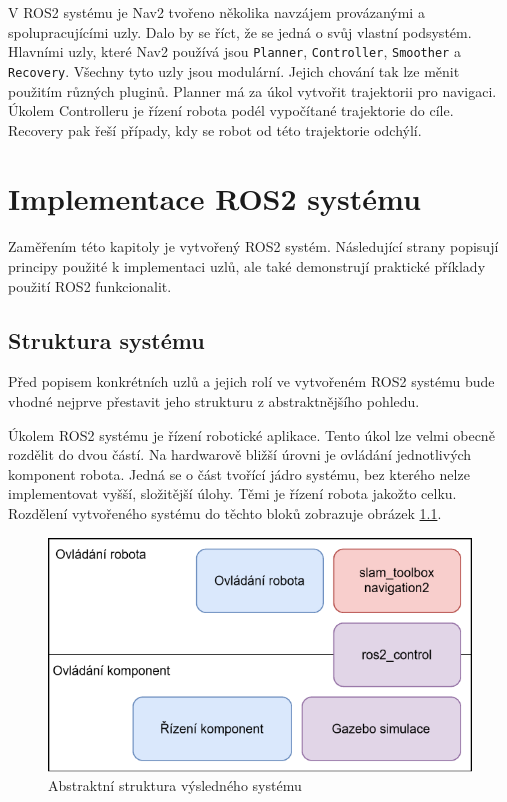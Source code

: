 V ROS2 systému je Nav2 tvořeno několika navzájem provázanými a spolupracujícími uzly. Dalo by se říct, že se jedná o svůj vlastní podsystém. Hlavními uzly, které Nav2 používá jsou \verb|Planner|, \verb|Controller|, \verb|Smoother| a \verb|Recovery|. Všechny tyto uzly jsou modulární. Jejich chování tak lze měnit použitím různých pluginů. Planner má za úkol vytvořit trajektorii pro navigaci. Úkolem Controlleru je řízení robota podél vypočítané trajektorie do cíle. Recovery pak řeší případy, kdy se robot od této trajektorie odchýlí. \cite{nav2_documentation}

\chapter{Implementace ROS2 systému}
Zaměřením této kapitoly je vytvořený ROS2 systém. Následující strany popisují principy použité k implementaci uzlů, ale také demonstrují praktické příklady použití ROS2 funkcionalit.

\section{Struktura systému}
Před popisem konkrétních uzlů a jejich rolí ve vytvořeném ROS2 systému bude vhodné nejprve přestavit jeho strukturu z abstraktnějšího pohledu.

Úkolem ROS2 systému je řízení robotické aplikace. Tento úkol lze velmi obecně rozdělit do dvou částí. Na hardwarově bližší úrovni je ovládání jednotlivých komponent robota. Jedná se o část tvořící jádro systému, bez kterého nelze implementovat vyšší, složitější úlohy. Těmi je řízení robota jakožto celku. Rozdělení vytvořeného systému do těchto bloků zobrazuje obrázek \ref{fig:system_structure}. 

\begin{figure}[h!]
	\centering
	\includegraphics[scale=0.75]{obrazky-figures/system_structure.pdf}
	\caption{Abstraktní struktura výsledného systému}
	\label{fig:system_structure}
\end{figure}

